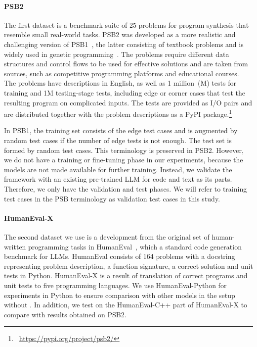 \paragraph{PSB2}
The first dataset is a benchmark suite of 25 problems for program synthesis that resemble small real-world tasks. PSB2 was developed as a more realistic and challenging version of PSB1~\cite{helmuth2015:general}, the latter consisting of textbook problems and is widely used in genetic programming~\cite{sobania2022:choose}. 
The problems require different data structures and control flows to be used for effective solutions and are taken from sources, such as competitive programming platforms and educational courses. 
The problems have descriptions in English, as well as 1 million~(M) tests for training and 1M testing-stage tests, including edge or corner cases that test the resulting program on complicated inputs. 
The tests are provided as I/O pairs and are distributed together with the problem descriptions as a PyPI package.\footnote{~\url{https://pypi.org/project/psb2/}} 

In PSB1, the training set consists of the edge test cases and is augmented by random test cases if the number of edge tests is not enough. The test set is formed by random test cases. 
This terminology is preserved in PSB2. 
However, we do not have a training or fine-tuning phase in our experiments, because the models are not made available for further training. Instead, we validate the framework with an existing pre-trained LLM for code and text as its parts. 
Therefore, we only have the validation and test phases. 
We will refer to training test cases in the PSB terminology as validation test cases in this study. 

\paragraph{HumanEval-X}
The second dataset we use is a development from the original set of human-written programming tasks in HumanEval~\cite{chenEvaluatingLargeLanguage2021}, which a standard code generation benchmark for LLMs.
HumanEval consists of 164 problems with a docstring representing problem description, a function signature, a correct solution and unit tests in Python. 
HumanEval-X is a result of translation of correct programs and unit tests to five programming languages. 
We use HumanEval-Python for experiments in Python to ensure comparison with other models in the setup without \method{}. 
In addition, we test \method{} on the HumanEval-C++ part of HumanEval-X to compare with results obtained on PSB2. %

